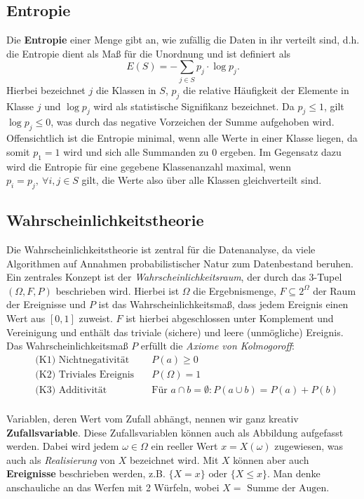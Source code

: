 \subsection{Entropie}
Die \textbf{Entropie} einer Menge gibt an, wie zufällig die Daten in ihr verteilt sind, d.h. die Entropie dient als Maß für die Unordnung und ist definiert als
\[
	E(S)=-\sum\limits_{j\in S} p_j \cdot \log{p_j}.
\]
Hierbei bezeichnet \(j\) die Klassen in \(S\), \(p_j\) die relative Häufigkeit der Elemente in Klasse \(j\) und \(\log{p_j}\) wird als statistische Signifikanz bezeichnet. Da \(p_j \leq 1 \), gilt \(\log{p_j} \leq 0\), was durch das negative Vorzeichen der Summe aufgehoben wird. Offensichtlich ist die Entropie minimal, wenn alle Werte in einer Klasse liegen, da somit \(p_1 = 1\) wird und sich alle Summanden zu \(0\) ergeben. Im Gegensatz dazu wird die Entropie für eine gegebene Klassenanzahl maximal, wenn \(p_i = p_j,\ \forall i,j\in S\) gilt, die Werte also über alle Klassen gleichverteilt sind. 

\subsection{Wahrscheinlichkeitstheorie}
Die Wahrscheinlichkeitstheorie ist zentral für die Datenanalyse, da viele Algorithmen auf Annahmen probabilistischer Natur zum Datenbestand beruhen. Ein zentrales Konzept ist der \textit{Wahrscheinlichkeitsraum}, der durch das 3-Tupel \((\Omega, F, P)\) beschrieben wird. Hierbei ist \(\Omega\) die Ergebnismenge, \(F\subseteq 2^{\Omega}\) der Raum der Ereignisse und \(P\) ist das Wahrscheinlichkeitsmaß, dass jedem Ereignis einen Wert aus \([0,1]\) zuweist. \(F\) ist hierbei abgeschlossen unter Komplement und Vereinigung und enthält das triviale (sichere) und leere (unmögliche) Ereignis. Das Wahrscheinlichkeitsmaß \(P\) erfüllt die \textit{Axiome von Kolmogoroff}:
\begin{align*}
	&\text{(K1) Nichtnegativität}	&\quad P(a)\geq 0\\
	&\text{(K2) Triviales Ereignis}	&\quad P(\Omega) = 1\\
	&\text{(K3) Additivität}	&\quad \text{Für } a\cap b = \emptyset: P(a\cup b) = P(a) + P(b)\\
\end{align*}

\noindent Variablen, deren Wert vom Zufall abhängt, nennen wir ganz kreativ \textbf{Zufallsvariable}. Diese Zufallsvariablen können auch als Abbildung aufgefasst werden. Dabei wird jedem \(\omega \in \Omega\) ein reeller Wert \(x = X(\omega)\) zugewiesen, was auch als \textit{Realisierung} von \(X\) bezeichnet wird. Mit \(X\) können aber auch \textbf{Ereignisse} beschrieben werden, z.B. \(\{X = x\} \text{ oder } \{X \leq x\}\). Man denke anschauliche an das Werfen mit 2 Würfeln, wobei \(X = \text{ Summe der Augen}\).

